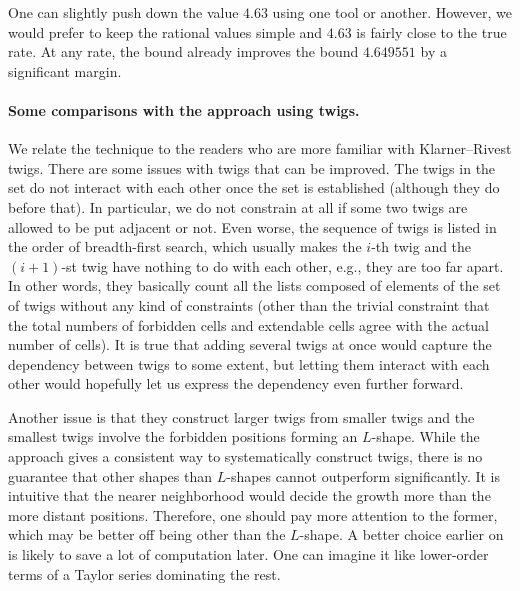 \documentclass[a4paper,12pt]{article}
\begin{document}
One can slightly push down the value $4.63$ using one tool or another. However, we would prefer to keep the rational values simple and $4.63$ is fairly close to the true rate. At any rate, the bound already improves the bound $4.649551$ by a significant margin.

\paragraph{Some comparisons with the approach using twigs.}
We relate the technique to the readers who are more familiar with Klarner--Rivest twigs.
There are some issues with twigs that can be improved. The twigs in the set do not interact with each other once the set is established (although they do before that). In particular, we do not constrain at all if some two twigs are allowed to be put adjacent or not. Even worse, the sequence of twigs is listed in the order of breadth-first search, which usually makes the $i$-th twig and the $(i+1)$-st twig have nothing to do with each other, e.g., they are too far apart. In other words, they basically count all the lists composed of elements of the set of twigs without any kind of constraints (other than the trivial constraint that the total numbers of forbidden cells and extendable cells agree with the actual number of cells).
It is true that adding several twigs at once would capture the dependency between twigs to some extent, but letting them interact with each other would hopefully let us express the dependency even further forward.

Another issue is that they construct larger twigs from smaller twigs and the smallest twigs involve the forbidden positions forming an $L$-shape. While the approach gives a consistent way to systematically construct twigs, there is no guarantee that other shapes than $L$-shapes cannot outperform significantly.
It is intuitive that the nearer neighborhood would decide the growth more than the more distant positions. Therefore, one should pay more attention to the former, which may be better off being other than the $L$-shape. A better choice earlier on is likely to save a lot of computation later. One can imagine it like lower-order terms of a Taylor series dominating the rest.
\end{document}
